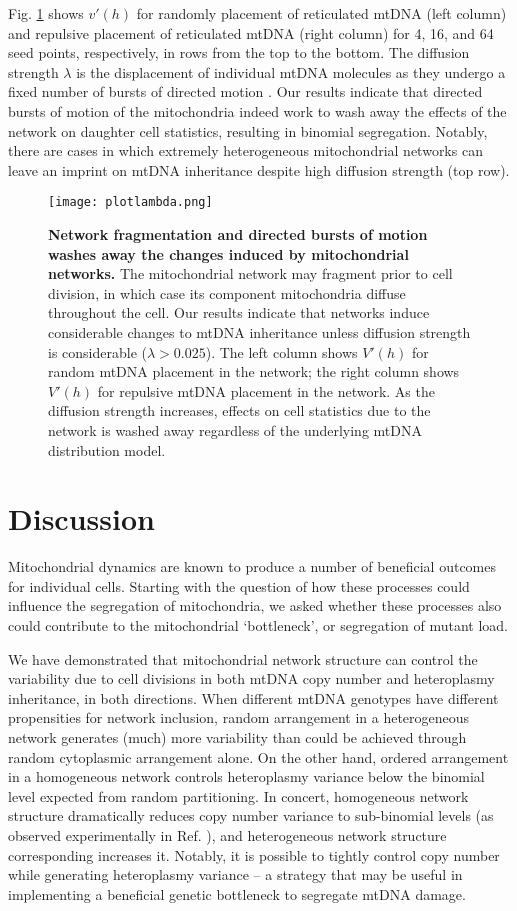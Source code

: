 \documentclass{article}
\begin{document}
Fig. \ref{fig:diffusion} shows $v'(h)$ for randomly placement of reticulated mtDNA (left column) and repulsive placement of reticulated mtDNA (right column) for 4, 16, and 64 seed points, respectively, in rows from the top to the bottom. The diffusion strength $\lambda$ is the displacement of individual mtDNA molecules as they undergo a fixed number of bursts of directed motion \citep{moore2021actin}. Our results indicate that directed bursts of motion of the mitochondria indeed work to wash away the effects of the network on daughter cell statistics, resulting in binomial segregation. Notably, there are cases in which extremely heterogeneous mitochondrial networks can leave an imprint on mtDNA inheritance despite high diffusion strength (top row).

\begin{figure}
\centering
\texttt{[image: plotlambda.png]}
\caption{\textbf{Network fragmentation and directed bursts of motion washes away the changes induced by mitochondrial networks.} The mitochondrial network may fragment prior to cell division, in which case its component mitochondria diffuse throughout the cell. Our results indicate that networks induce considerable changes to mtDNA inheritance unless diffusion strength is considerable ($\lambda>0.025$). The left column shows $V'(h)$ for random mtDNA placement in the network; the right column shows $V'(h)$ for repulsive mtDNA placement in the network. As the diffusion strength increases, effects on cell statistics due to the network is washed away regardless of the underlying mtDNA distribution model.}\label{fig:diffusion}
\end{figure}

\section{Discussion}
Mitochondrial dynamics are known to produce a number of beneficial outcomes for individual cells. Starting with the question of how these processes could influence the segregation of mitochondria, we asked whether these processes also could contribute to the mitochondrial `bottleneck', or segregation of mutant load.

We have demonstrated that mitochondrial network structure can control the variability due to cell divisions in both mtDNA copy number and heteroplasmy inheritance, in both directions. When different mtDNA genotypes have different propensities for network inclusion, random arrangement in a heterogeneous network generates (much) more variability than could be achieved through random cytoplasmic arrangement alone. On the other hand, ordered arrangement in a homogeneous network controls heteroplasmy variance below the binomial level expected from random partitioning. In concert, homogeneous network structure dramatically reduces copy number variance to sub-binomial levels (as observed experimentally in Ref. \cite{jajoo2016accurate}), and heterogeneous network structure corresponding increases it. Notably, it is possible to tightly control copy number while generating heteroplasmy variance -- a strategy that may be useful in implementing a beneficial genetic bottleneck to segregate mtDNA damage.
\end{document}

